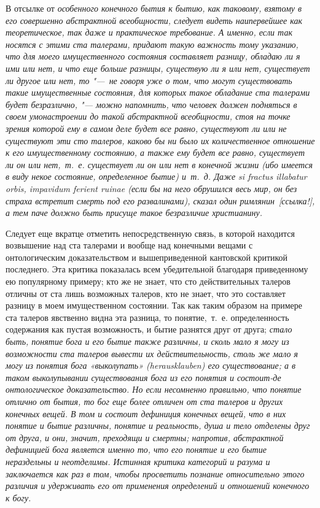 В отсылке от \em{особенного конечного} бытия к бытию,
как таковому, взятому в его совершенно абстрактной всеобщности, следует
видеть наипервейшее как теоретическое, так даже и практическое требование.
А именно, если так носятся с этими ста талерами, придают такую важность
тому указанию, что для моего имущественного состояния составляет разницу,
\em{обладаю} ли я ими или
\em{нет}, и что еще больше разницы, существую ли я или
нет, существует ли другое или нет, то "---~не говоря уже о том, что могут
существовать такие имущественные состояния, для которых такое обладание ста
талерами будет безразлично, "--- можно напомнить, что человек должен подняться
в своем умонастроении до такой абстрактной всеобщности, стоя на точке
зрения которой ему в самом деле будет все равно, существуют ли или не
существуют эти сто талеров, каково бы ни было их количественное отношение к
его имущественному состоянию, а также ему будет все равно, существует ли он
или нет,~т.~е. существует ли он или нет в конечной жизни (ибо имеется в
виду некое состояние, определенное бытие) и~т.~д. Даже si fractus illabatur
orbis, impavidum ferient ruinae (если бы на него обрушился весь мир, он без
страха встретит смерть под его развалинами), сказал один
римлянин~[ссылка!], а тем паче должно быть присуще такое
безразличие христианину.

Следует еще вкратце отметить непосредственную связь, в которой находится
возвышение над ста талерами и вообще над конечными вещами с онтологическим
доказательством и вышеприведенной кантовской критикой последнего. Эта
критика показалась всем убедительной благодаря приведенному ею популярному
примеру; кто же не знает, что сто действительных талеров отличны от ста
лишь возможных талеров, кто не знает, что это составляет разницу в моем
имущественном состоянии. Так как таким образом на примере ста талеров
явственно видна эта разница, то понятие,~т.~е. определенность содержания
как пустая возможность, и бытие разнятся друг от друга;
\em{стало быть}, понятие бога и его бытие также
различны, и сколь мало я могу из возможности ста талеров вывести их
действительность, столь же мало я могу из понятия бога «выколупать»
(herausklauben) его существование; а в таком выколупывании существования
бога из его понятия и состоит-де онтологическое доказательство. Но если
несомненно правильно, что понятие отлично от бытия, то бог еще более
отличен от ста талеров и других конечных вещей. В том и состоит
\em{дефиниция конечных вещей}, что в них понятие и
бытие различны, понятие и реальность, душа и тело отделены друг от друга, и
они, значит, преходящи и смертны; напротив, абстрактной дефиницией бога
является именно то, что его понятие и его бытие
\em{нераздельны} и
\em{неотделимы}. Истинная критика категорий и разума и
заключается как раз в том, чтобы просветить познание относительно этого
различия и удерживать его от применения определений и отношений конечного к
богу.
